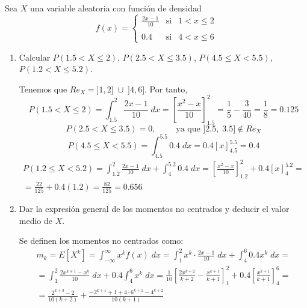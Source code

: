 \begin{ejercicio}
    Sea $X$ una variable aleatoria con función de densidad
    \begin{equation*}
        f(x) = \left\{\begin{array}{lll}
            \displaystyle \frac{2x-1}{10} & \text{si} & 1 < x \leq 2 \\
            \\
            0.4 & \text{si} & 4<x\leq 6
        \end{array}\right.
    \end{equation*}

    \begin{enumerate}
        \item Calcular $P(1.5 < X \leq 2)$, $P(2.5 < X \leq 3.5)$, $P(4.5 \leq X <5.5)$, $P(1.2 < X \leq 5.2)$.

        Tenemos que $Re_X = ]1,2]\;\cup\; ]4,6]$. Por tanto,
        \begin{equation*}
            P(1.5 < X \leq 2) = \int_{1.5}^2 \frac{2x-1}{10}\;dx = \left[\frac{x^2-x}{10}\right]_{1.5}^2 = \frac{1}{5} - \frac{3}{40} = \frac{1}{8} = 0.125
        \end{equation*}
        \begin{equation*}
            P(2.5 < X \leq 3.5) = 0,\qquad \text{ ya que $]2.5,\;3.5]\notin Re_X$}
        \end{equation*}
        \begin{equation*}
            P(4.5 \leq X < 5.5) = \int_{4.5}^{5.5} 0.4\;dx = 0.4\left[x\right]_{4.5}^{5.5} = 0.4
        \end{equation*}
        \begin{multline*}
            P(1.2 \leq X < 5.2) = \int_{1.2}^2 \frac{2x-1}{10}\;dx +  \int_{4}^{5.2} 0.4\;dx
            = \left[\frac{x^2-x}{10}\right]_{1.2}^2
            +0.4\left[x\right]_{4}^{5.2} =\\= \frac{22}{125} + 0.4(1.2) = \frac{82}{125} = 0.656
        \end{multline*}

        \item Dar la expresión general de los momentos no centrados y deducir el valor medio de $X$.

        Se definen los momentos no centrados como:
        \begin{multline*}
            m_k = E[X^k] = \int_{-\infty}^{\infty}x^kf(x)\;dx = \int_{1}^2x^k\cdot \frac{2x-1}{10}\;dx + \int_4^6 0.4x^k\;dx =\\
            = \int_{1}^2 \frac{2x^{k+1}-x^k}{10}\;dx + 0.4\int_4^6 x^k\;dx
            = \frac{1}{10}\left[\frac{2x^{k+2}}{k+2} - \frac{x^{k+1}}{k+1}\right]_{1}^2
            +0.4\left[\frac{x^{k+1}}{k+1}\right]_{4}^{6} =\\
            = \frac{2^{k+3}-2}{10(k+2)} + \frac{-2^{k+1} + 1 +4\cdot 6^{k+1}-4^{k+2}}{10(k+1)}
        \end{multline*}


\end{enumerate}
\end{ejercicio}

